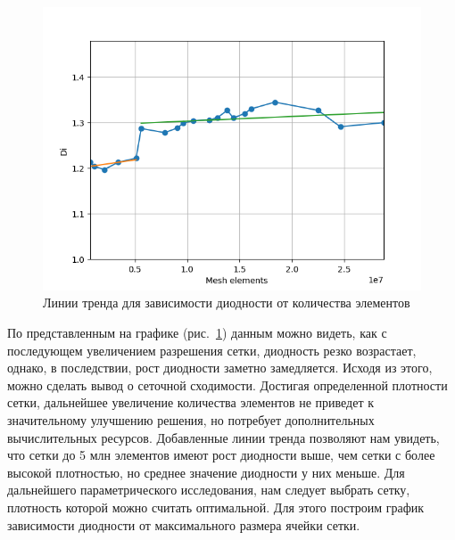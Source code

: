 \documentclass[14pt,a4paper]{article}
\begin{document}
         
         
         
         \begin{figure}[H]
             \centering
             \includegraphics[width = 1\linewidth]{graphDiWithTrendLine}
             \caption{Линии тренда для зависимости диодности от количества элементов}
             \label{fig:graphDiWithTrendLine}
         \end{figure}     
         
         По представленным на графике (рис.~\ref{fig:graphDiWithTrendLine}) данным можно видеть, как с последующем увеличением разрешения сетки, диодность резко возрастает, однако, в последствии, рост диодности заметно замедляется. Исходя из этого, можно сделать вывод о сеточной сходимости. Достигая определенной плотности сетки, дальнейшее увеличение количества элементов не приведет к значительному улучшению решения, но потребует дополнительных вычислительных ресурсов. Добавленные линии тренда позволяют нам увидеть, что сетки до 5 млн элементов имеют рост диодности выше, чем сетки с более высокой плотностью, но среднее значение диодности у них меньше. Для дальнейшего параметрического исследования, нам следует выбрать сетку, плотность которой можно считать оптимальной. Для этого построим график зависимости диодности от максимального размера ячейки сетки.
         
\end{document}
